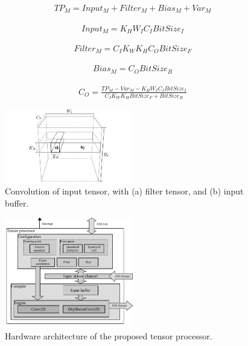 \begin{eqnarray} \label{eq:tp_memory}
TP_{M}=Input_{M}+Filter_{M}+Bias_{M}+Var_{M}
\end{eqnarray}	

\begin{eqnarray} \label{eq:input_memory}
Input_{M}=K_{H}W_{I}C_{I}BitSize_{I}
\end{eqnarray}

\begin{eqnarray} \label{eq:filter_memory}
Filter_{M}=C_{I}K_{W}K_{H}C_{O}BitSize_{F}
\end{eqnarray}

\begin{eqnarray} \label{eq:bias_memory}
Bias_{M}=C_{O}BitSize_{B}
\end{eqnarray}

\begin{eqnarray} \label{eq:channel_in_memory}
C_{O}=\frac{TP_{M}-Var_{M}-K_{H}W_{I}C_{I}BitSize_{I}}{C_{I}K_{W}K_{H}BitSize_{F}+BitSize_{B}}
\end{eqnarray}

\begin{figure}[h!]
	\centering
	\includegraphics[width=0.5\textwidth]{../figures/accelerator_buffers.pdf}
	\caption{Convolution of input tensor, with (a) filter tensor, and (b) input buffer. }
	\label{fig:accelerator_buffers}
\end{figure}

\begin{figure}[h!]
	\centering
	\includegraphics[width=0.5\textwidth]{../figures/accelerator.pdf}
	\caption{Hardware architecture of the proposed tensor processor.}
	\label{fig:accelerator}
\end{figure}

